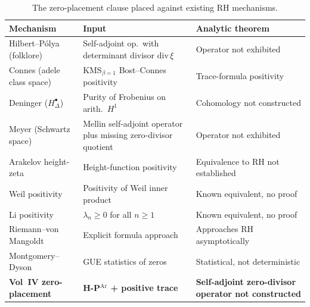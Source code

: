 \begin{table}[h]
\centering
\small
\begin{tabular}{@{}>{\raggedright\arraybackslash}p{}|>{\raggedright\arraybackslash}p{}|>{\raggedright\arraybackslash}p{}@{}}
Mechanism & Input & Analytic theorem \\
\hline
Hilbert--P\'olya (folklore) & Self-adjoint op.~with determinant divisor \(\mathrm{div}\,\xi\) & Operator not exhibited \\
Connes (adele class space) & KMS\({}_{\beta=1}\) Bost--Connes positivity & Trace-formula positivity \\
Deninger (\(H^{\bullet}_{\Delta}\)) & Purity of Frobenius on arith.~\(H^{1}\) & Cohomology not constructed \\
Meyer (Schwartz space) & Mellin self-adjoint operator plus missing zero-divisor quotient & Operator not exhibited \\
Arakelov height-zeta & Height-function positivity & Equivalence to RH not established \\
Weil positivity & Positivity of Weil inner product & Known equivalent, no proof \\
Li positivity & \(\lambda_{n}\geq 0\) for all \(n\geq 1\) & Known equivalent, no proof \\
Riemann--von Mangoldt & Explicit formula approach & Approaches RH asymptotically \\
Montgomery--Dyson & GUE statistics of zeros & Statistical, not deterministic \\
\textbf{Vol~IV zero-placement} & \textbf{H-P\(^{\mathrm{Ar}}\) + positive trace} & \textbf{Self-adjoint zero-divisor operator not constructed} \\
\end{tabular}
\caption{The zero-placement clause placed against existing RH mechanisms.}
\label{v4-arith:rh:table:comparison}
\end{table}

